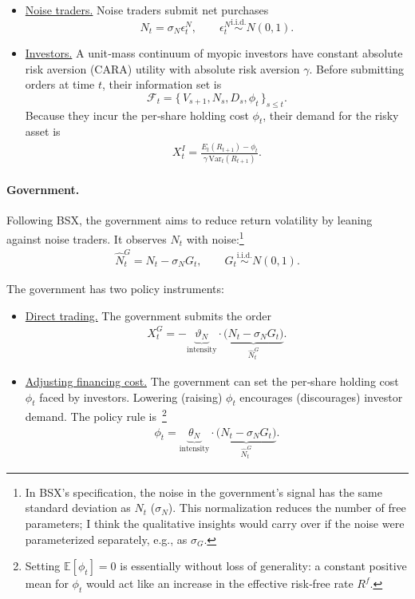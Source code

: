 \documentclass[12pt]{article}
\begin{document}
\begin{itemize}
\item \underline{Noise traders.}
Noise traders submit net purchases
\[
N_t = \sigma_N \epsilon_t^N, \qquad \epsilon_t^N \stackrel{\text{i.i.d.}}{\sim} N(0,1).
\]

\item \underline{Investors.}
A unit‑mass continuum of myopic investors have constant absolute risk aversion (CARA) utility with absolute risk aversion \(\gamma\). Before submitting orders at time $t$, their information set is  
\[
\mathcal{F}_t = \{\, V_{s+1}, N_s, D_s, \phi_t \,\}_{s \le t}.
\]  
Because they incur the per‑share holding cost \(\phi_t\), their demand for the risky asset is
\begin{align}
    X_t^I = \frac{E_t(R_{t+1}) - \phi_t}{\gamma \,\mathrm{Var}_t(R_{t+1})}. \label{demand_with_phi}
\end{align}
\end{itemize}

\paragraph{Government.}
Following BSX, the government aims to reduce return volatility by leaning against noise traders. It observes \(N_t\) with noise:\footnote{In BSX's specification, the noise in the government's signal has the same standard deviation as \(N_t\) (\(\sigma_N\)). This normalization reduces the number of free parameters; I think the qualitative insights would carry over if the noise were parameterized separately, e.g., as \(\sigma_G\).}
\begin{align}
    \hat{N}_t^G = N_t - \sigma_N G_t, \qquad G_t \stackrel{\text{i.i.d.}}{\sim} N(0,1). \label{govt_noisy_signal}
\end{align}


The government has two policy instruments:

\begin{itemize}
    \item \underline{Direct trading.} The government submits the order
    \begin{align}
        X_t^G = - \underbrace{\vartheta_N}_{\text{intensity}} \cdot \underbrace{\bigl(N_t - \sigma_N G_t\bigr)}_{\hat{N}_t^G}. \label{govt_demand}
    \end{align}

    \item \underline{Adjusting financing cost.} The government can set the per‑share holding cost \(\phi_t\) faced by investors. Lowering (raising) \(\phi_t\) encourages (discourages) investor demand. The policy rule is~\footnote{Setting \(\mathbb{E}[\phi_t]=0\) is essentially without loss of generality: a constant positive mean for \(\phi_t\) would act like an increase in the effective risk‑free rate \(R^f\).}
    \begin{align}
        \phi_t = \underbrace{\theta_N}_{\text{intensity}} \cdot \underbrace{\bigl(N_t - \sigma_N G_t\bigr)}_{\hat{N}_t^G}. \label{phi}
    \end{align}
    
\end{itemize}
\end{document}
